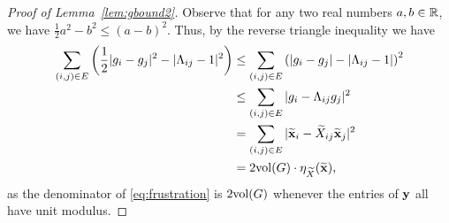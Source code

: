 \begin{proof}[Proof of Lemma~\ref{lem:gbound2}]
  Observe that for any two real numbers $a, b \in \mathbb{R}$, we have $\frac{1}{2} a^2 - b^2 \le (a - b)^2$. Thus, by the reverse triangle inequality we have
  \begin{equation}
    \begin{aligned}
      \sum_{(i, j) \in E}  \left(\frac{1}{2} |g_i - g_j|^2 - |\Lambda_{ij} - 1|^2\right)
      &\le \sum_{(i, j) \in E}  \left( |g_i - g_j| - |\Lambda_{ij} - 1|\right)^2 \\
      &\le \sum_{(i, j) \in E}  |g_i - \Lambda_{ij}g_j|^2 \\
      &= \sum_{(i, j) \in E}  |\widetilde{\mathbf x}_i - \widetilde{X}_{ij} \widetilde{\mathbf x}_j |^2 \\
      &= 2 \mathrm{vol}(G) \cdot \eta_{\widetilde{X}}(\widetilde{\mathbf x}),
    \end{aligned}
    \label{eq:gi_to_frustration}
  \end{equation}
%
as the denominator of \eqref{eq:frustration} is $2\mathrm{vol}(G)$ whenever the entries of $\mathbf y$ all have unit modulus.


\end{proof}
